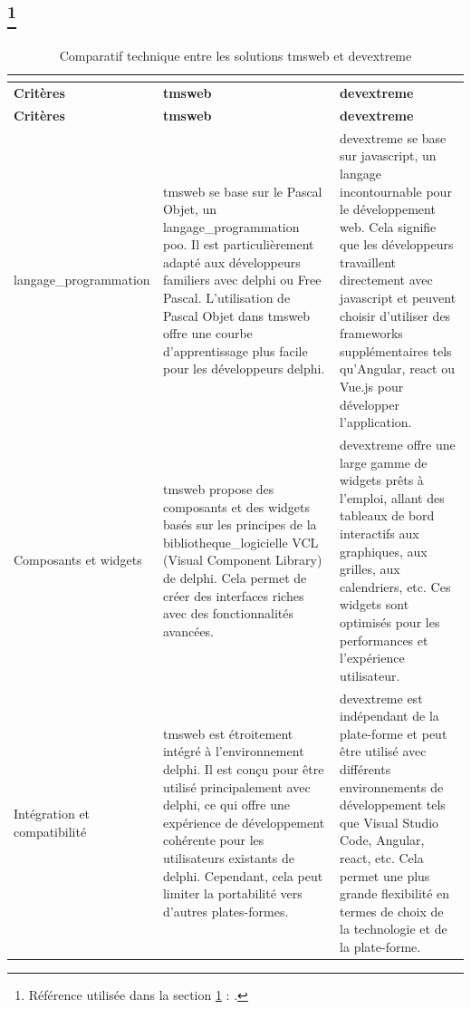 \documentclass[a4paper, 12pt, french]{article}
\newcommand{\printSectionFootnote}[2]{
	\nameref{#1} \footnote{Référence utilisée dans la section \ref{#1} \nameref{#1} : \cite{#2}.}
}
\begin{document}
		\newpage
		\begin{landscape}
		\section[Comparatif technique entre les solutions \gls{tmsweb} et \gls{devextreme}]{\printSectionFootnote{appendix:tms_devextreme}{methodologie:outils_technologiques:delphi:tms_web, devexpress}}\label{appendix:tms_devextreme}
			\begin{longtable}[c]{p{3cm}|p{8.5cm}|p{8.5cm}}
				\caption{Comparatif technique entre les solutions \gls{tmsweb} et \gls{devextreme}}\\
				\label{tab:tms_devextreme}\\
				\toprule
				\textbf{Critères} & \textbf{\gls{tmsweb}} & \textbf{\gls{devextreme}}\\
				\midrule
				\endfirsthead
				\toprule
				\textbf{Critères} & \textbf{\gls{tmsweb}} & \textbf{\gls{devextreme}}\\
				\midrule
				\endhead
						\hline
						\gls{langage_programmation} & \gls{tmsweb} se base sur le Pascal Objet, un \gls{langage_programmation} \gls{poo}. Il est particulièrement adapté aux développeurs familiers avec \gls{delphi} ou Free Pascal. L'utilisation de Pascal Objet dans \gls{tmsweb} offre une courbe d'apprentissage plus facile pour les développeurs \gls{delphi}. & \gls{devextreme} se base sur \gls{javascript}, un langage incontournable pour le développement web. Cela signifie que les développeurs travaillent directement avec \gls{javascript} et peuvent choisir d'utiliser des \glspl{framework} supplémentaires tels qu'Angular, \gls{react} ou Vue.js pour développer l'application.\\
						\hline
						Composants et widgets & \gls{tmsweb} propose des composants et des widgets basés sur les principes de la \gls{bibliotheque_logicielle} VCL (Visual Component Library) de \gls{delphi}. Cela permet de créer des interfaces riches avec des fonctionnalités avancées. & \gls{devextreme} offre une large gamme de widgets prêts à l'emploi, allant des tableaux de bord interactifs aux graphiques, aux grilles, aux calendriers, etc. Ces widgets sont optimisés pour les performances et l'expérience utilisateur.\\
						\hline
						Intégration et compatibilité & \gls{tmsweb} est étroitement intégré à l'environnement \gls{delphi}. Il est conçu pour être utilisé principalement avec \gls{delphi}, ce qui offre une expérience de développement cohérente pour les utilisateurs existants de \gls{delphi}. Cependant, cela peut limiter la portabilité vers d'autres plates-formes. & \gls{devextreme} est indépendant de la plate-forme et peut être utilisé avec différents environnements de développement tels que Visual Studio Code, Angular, \gls{react}, etc. Cela permet une plus grande flexibilité en termes de choix de la technologie et de la plate-forme.\\

\end{longtable}
\end{landscape}
\end{document}
